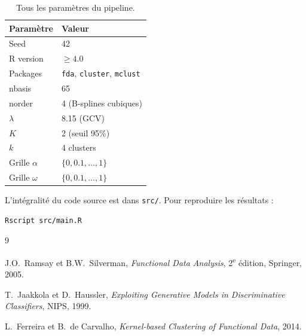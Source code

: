 \documentclass[11pt, a4paper]{article}
\theoremstyle{definition}
\theoremstyle{remark}
\begin{document}
\begin{table}[H]
\centering
\begin{tabular}{ll}
  \toprule
  \textbf{Paramètre} & \textbf{Valeur} \\
  \midrule
  Seed       & 42 \\
  R version  & $\geq 4.0$ \\
  Packages   & \texttt{fda}, \texttt{cluster}, \texttt{mclust} \\
  nbasis     & 65 \\
  norder     & 4 (B-splines cubiques) \\
  $\lambda$  & 8.15 (GCV) \\
  $K$        & 2 (seuil 95\%) \\
  $k$        & 4 clusters \\
  Grille $\alpha$ & $\{0, 0.1, \ldots, 1\}$ \\
  Grille $\omega$ & $\{0, 0.1, \ldots, 1\}$ \\
  \bottomrule
\end{tabular}
\caption{Tous les paramètres du pipeline.}
\end{table}

\bigskip

L'intégralité du code source est dans \texttt{src/}. Pour reproduire les résultats :
\begin{lstlisting}
Rscript src/main.R
\end{lstlisting}

\begin{thebibliography}{9}

  J.O.~Ramsay et B.W.~Silverman,
  \textit{Functional Data Analysis}, 2\textsuperscript{e} édition,
  Springer, 2005.

  T.~Jaakkola et D.~Haussler,
  \textit{Exploiting Generative Models in Discriminative Classifiers},
  NIPS, 1999.

  L.~Ferreira et B.~de Carvalho,
  \textit{Kernel-based Clustering of Functional Data},
  2014.

\end{thebibliography}
\end{document}
